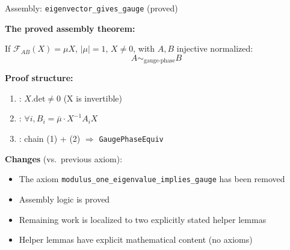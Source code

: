 \documentclass[aspectratio=169,10pt]{beamer}
\begin{document}
\begin{frame}{Assembly: \texttt{eigenvector\_gives\_gauge} \textcolor{leangreen}{(proved)}}
    \vspace{-0.5em}

    \textbf{The proved assembly theorem:}

    {\small
    If $\mathcal{F}_{AB}(X) = \mu X$, $|\mu| = 1$, $X \neq 0$, with $A,B$ injective normalized:
    \[
        A \sim_{\text{gauge-phase}} B
    \]}

    \vspace{0.1em}
    \textbf{Proof structure:}
    \begin{enumerate}\itemsep0.05em\small
        \item {}: $X.\mathrm{det} \neq 0$ \quad(X is invertible)
        \item {}: $\forall i,  B_i = \bar\mu \cdot X^{-1} A_i X$
        \item {}: chain (1) + (2) $\Rightarrow$ \texttt{GaugePhaseEquiv}
    \end{enumerate}

    \vspace{0.15em}
    \textbf{\textcolor{leangreen}{Changes}} (vs.\ previous axiom):
    \begin{itemize}\itemsep0.05em\small
        \item[\textcolor{leangreen}{\checkmark}] The axiom \texttt{modulus\_one\_eigenvalue\_implies\_gauge} has been removed
        \item[\textcolor{leangreen}{\checkmark}] Assembly logic is proved
        \item[\textcolor{leangreen}{\checkmark}] Remaining work is localized to two explicitly stated helper lemmas
        \item[\textcolor{leangreen}{\checkmark}] Helper lemmas have explicit mathematical content (no axioms)
    \end{itemize}

    \vspace{0.15em}
    \begin{center}
    \end{center}
\end{frame}
\end{document}
